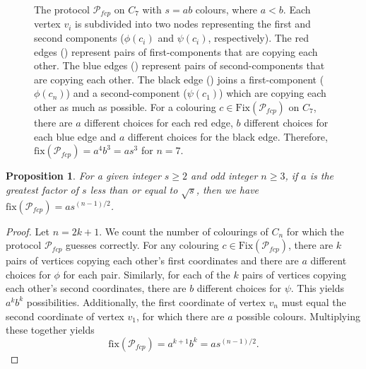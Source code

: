 \documentclass{birkjour}
\newtheorem{prop}[thm]{Proposition}
\theoremstyle{indenteddefinition}
\theoremstyle{indenteddefinition}
\numberwithin{equation}{section}
\renewcommand{\Pr}{\mathcal{P}}
\newcommand{\fix}{\mbox{fix}}
\newcommand{\Fix}{\mbox{Fix}}
\begin{document}
\begin{figure}
\begin{center}
\caption[]{The protocol $\Pr_{fcp}$ on $C_7$ with $s=ab$ colours, where $a<b$. Each vertex $v_i$ is subdivided into two nodes representing the first and second components ($\phi(c_i)$ and $\psi(c_i)$, respectively). The red edges () represent pairs of first-components that are copying each other. The blue edges () represent pairs of second-components that are copying each other. The black edge () joins a first-component ($\phi(c_n)$) and a second-component ($\psi(c_1)$) which are copying each other as much as possible. For a colouring $c \in \Fix(\Pr_{fcp})$ on $C_7$, there are $a$ different choices for each red edge, $b$ different choices for each blue edge and $a$ different choices for the black edge. Therefore, $\fix(\Pr_{fcp}) = a^4b^3=as^3$ for $n=7$.}
\label{fig:57cycle}
\end{center}
\end{figure}



\begin{prop}
\label{prop:fix_Ffcp}
For a given integer $s \geq 2$ and odd integer $n \geq 3$, if $a$ is the greatest factor of $s$ less than or equal to $\sqrt{s}$, then we have $\fix(\Pr_{fcp}) = as^{(n-1)/2}$. 
\end{prop}
\begin{proof}
Let $n = 2k+1$. We count the number of colourings of $C_n$ for which the protocol $\Pr_{fcp}$ guesses correctly. For any colouring $c \in \Fix(\Pr_{fcp})$, there are $k$ pairs of vertices copying each other's first coordinates and there are $a$ different choices for $\phi$ for each pair. Similarly, for each of the $k$ pairs of vertices copying each other's second coordinates, there are $b$ different choices for $\psi$. This yields $a^kb^k$ possibilities. Additionally, the first coordinate of vertex $v_n$ must equal the second coordinate of vertex $v_1$, for which there are $a$ possible colours. Multiplying these together yields 
	$$ \fix(\Pr_{fcp}) = a^{k+1}b^k = as^{(n-1)/2}. $$
\end{proof}
\end{document}

